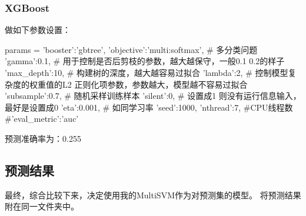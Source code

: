 \documentclass[UTF8,a4paper,AutoFakeBold,AutoFakeSlant]{article}
\begin{document}
\subsubsection{XGBoost}

做如下参数设置：
\begin{python}
  params = {
    'booster':'gbtree',
    'objective':'multi:softmax',   # 多分类问题
    'gamma':0.1,    # 用于控制是否后剪枝的参数，越大越保守，一般0.1 0.2的样子
    'max_depth':10,  # 构建树的深度，越大越容易过拟合
    'lambda':2,  # 控制模型复杂度的权重值的L2 正则化项参数，参数越大，模型越不容易过拟合
    'subsample':0.7, # 随机采样训练样本
    'silent':0,  # 设置成1 则没有运行信息输入，最好是设置成0
    'eta':0.001,  # 如同学习率
    'seed':1000,
    'nthread':7,  #CPU线程数
    #'eval_metric':'auc'
  }
\end{python}

预测准确率为：0.255



\subsection{预测结果}

最终，综合比较下来，决定使用我的MultiSVM作为对预测集的模型。
将预测结果附在同一文件夹中。





































% 
% 
% 
\end{document}
